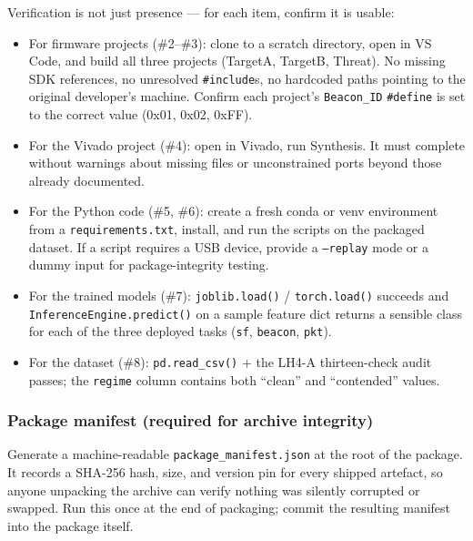 \documentclass[11pt,letterpaper]{article}
\begin{document}
Verification is not just presence --- for each item, confirm it is usable:

\begin{itemize}[leftmargin=2em]
	\item For firmware projects (\#2--\#3): clone to a scratch directory, open in VS Code, and build all three projects (TargetA, TargetB, Threat). No missing \mbox{SDK} references, no unresolved \texttt{\#include}s, no hardcoded paths pointing to the original developer's machine. Confirm each project's \texttt{Beacon\_ID} \texttt{\#define} is set to the correct value (0x01, 0x02, 0xFF).
	\item For the Vivado project (\#4): open in Vivado, run Synthesis. It must complete without warnings about missing files or unconstrained ports beyond those already documented.
	\item For the Python code (\#5, \#6): create a fresh conda or venv environment from a \texttt{requirements.txt}, install, and run the scripts on the packaged dataset. If a script requires a \mbox{USB} device, provide a \texttt{--replay} mode or a dummy input for package-integrity testing.
	\item For the trained models (\#7): \texttt{joblib.load()} / \texttt{torch.load()} succeeds and \texttt{InferenceEngine.predict()} on a sample feature dict returns a sensible class for each of the three deployed tasks (\texttt{sf}, \texttt{beacon}, \texttt{pkt}).
	\item For the dataset (\#8): \texttt{pd.read\_csv()} + the LH4-A thirteen-check audit passes; the \texttt{regime} column contains both ``clean'' and ``contended'' values.
\end{itemize}

\subsubsection*{Package manifest (required for archive integrity)}
Generate a machine-readable \texttt{package\_manifest.json} at the root of the package. It records a SHA-256 hash, size, and version pin for every shipped artefact, so anyone unpacking the archive can verify nothing was silently corrupted or swapped. Run this once at the end of packaging; commit the resulting manifest into the package itself.
\end{document}
